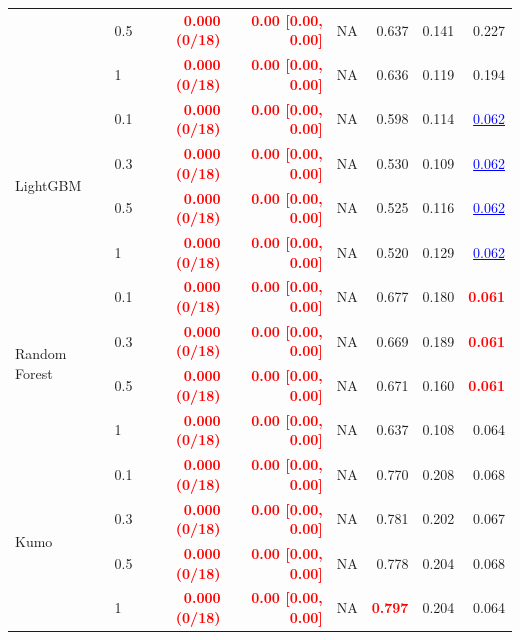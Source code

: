 \begin{table}[pos=!htbp,align=\centering]
{\begin{tabular}{llrrrrrr}
 & 0.5 & \textcolor{red}{\textbf{0.000 (0/18)}} & \textcolor{red}{\textbf{0.00 [0.00, 0.00]}} & NA & 0.637 & 0.141 & 0.227 \\
 & 1 & \textcolor{red}{\textbf{0.000 (0/18)}} & \textcolor{red}{\textbf{0.00 [0.00, 0.00]}} & NA & 0.636 & 0.119 & 0.194 \\
\midrule
\multirow{4}{*}{LightGBM} & 0.1 & \textcolor{red}{\textbf{0.000 (0/18)}} & \textcolor{red}{\textbf{0.00 [0.00, 0.00]}} & NA & 0.598 & 0.114 & \textcolor{blue}{\underline{0.062}} \\
 & 0.3 & \textcolor{red}{\textbf{0.000 (0/18)}} & \textcolor{red}{\textbf{0.00 [0.00, 0.00]}} & NA & 0.530 & 0.109 & \textcolor{blue}{\underline{0.062}} \\
 & 0.5 & \textcolor{red}{\textbf{0.000 (0/18)}} & \textcolor{red}{\textbf{0.00 [0.00, 0.00]}} & NA & 0.525 & 0.116 & \textcolor{blue}{\underline{0.062}} \\
 & 1 & \textcolor{red}{\textbf{0.000 (0/18)}} & \textcolor{red}{\textbf{0.00 [0.00, 0.00]}} & NA & 0.520 & 0.129 & \textcolor{blue}{\underline{0.062}} \\
\midrule
\multirow{4}{*}{Random Forest} & 0.1 & \textcolor{red}{\textbf{0.000 (0/18)}} & \textcolor{red}{\textbf{0.00 [0.00, 0.00]}} & NA & 0.677 & 0.180 & \textcolor{red}{\textbf{0.061}} \\
 & 0.3 & \textcolor{red}{\textbf{0.000 (0/18)}} & \textcolor{red}{\textbf{0.00 [0.00, 0.00]}} & NA & 0.669 & 0.189 & \textcolor{red}{\textbf{0.061}} \\
 & 0.5 & \textcolor{red}{\textbf{0.000 (0/18)}} & \textcolor{red}{\textbf{0.00 [0.00, 0.00]}} & NA & 0.671 & 0.160 & \textcolor{red}{\textbf{0.061}} \\
 & 1 & \textcolor{red}{\textbf{0.000 (0/18)}} & \textcolor{red}{\textbf{0.00 [0.00, 0.00]}} & NA & 0.637 & 0.108 & 0.064 \\
\midrule
\multirow{4}{*}{Kumo} & 0.1 & \textcolor{red}{\textbf{0.000 (0/18)}} & \textcolor{red}{\textbf{0.00 [0.00, 0.00]}} & NA & 0.770 & 0.208 & 0.068 \\
 & 0.3 & \textcolor{red}{\textbf{0.000 (0/18)}} & \textcolor{red}{\textbf{0.00 [0.00, 0.00]}} & NA & 0.781 & 0.202 & 0.067 \\
 & 0.5 & \textcolor{red}{\textbf{0.000 (0/18)}} & \textcolor{red}{\textbf{0.00 [0.00, 0.00]}} & NA & 0.778 & 0.204 & 0.068 \\
 & 1 & \textcolor{red}{\textbf{0.000 (0/18)}} & \textcolor{red}{\textbf{0.00 [0.00, 0.00]}} & NA & \textcolor{red}{\textbf{0.797}} & 0.204 & 0.064 \\

\end{tabular}}
\end{table}
